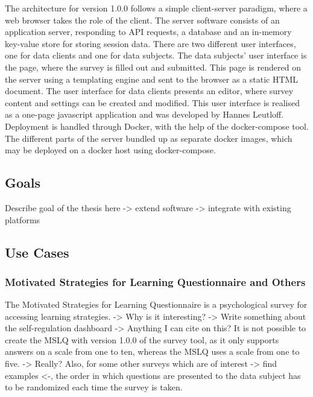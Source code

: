 \documentclass[a4paper,11pt]{article}
\begin{document}
            The architecture for version 1.0.0 follows a simple client-server paradigm, where
            a web browser takes the role of the client. The server software consists of an
            application server, responding to API requests, a database and an in-memory
            key-value store for storing session data. There are two different user interfaces,
            one for data clients and one for data subjects. The data subjects' user interface
            is the page, where the survey is filled out and submitted. This page is rendered
            on the server using a templating engine and sent to the browser as a static HTML document.
            The user interface for data clients presents an editor, where survey content and settings 
            can be created and modified. This user interface is realised as a one-page
            javascript application and was developed by Hannes Leutloff. Deployment is handled through
            Docker, with the help of the docker-compose tool. The different parts of the server
            bundled up as separate docker images, which may be deployed on a docker host using
            docker-compose.

        \subsection{Goals}
            Describe goal of the thesis here
            -> extend software
            -> integrate with existing platforms

        \subsection{Use Cases}

            \subsubsection{Motivated Strategies for Learning Questionnaire and Others}
            The Motivated Strategies for Learning Questionnaire is a psychological survey for accessing
            learning strategies. 
            -> Why is it interesting? 
            -> Write something about the self-regulation dashboard
            -> Anything I can cite on this?
            It is not possible to create the MSLQ with version 1.0.0 of the survey tool,
            as it only supports answers on a scale from one to ten, whereas the MSLQ uses
            a scale from one to five. -> Really?
            Also, for some other surveys which are of interest -> find examples <-,
            the order in which questions are presented to the data subject has to
            be randomized each time the survey is taken.
            
\end{document}
